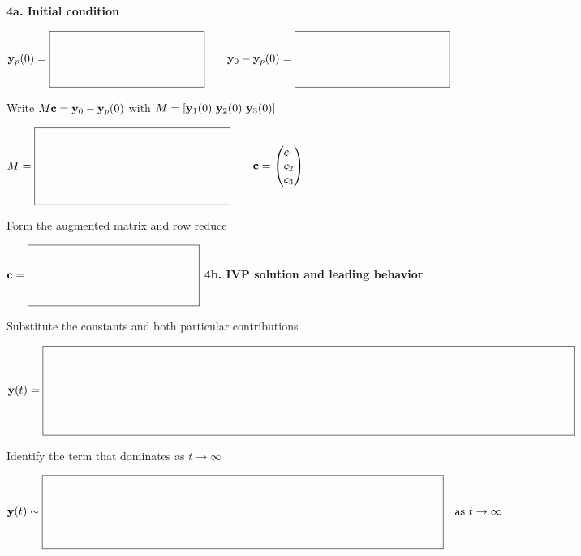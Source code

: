 \documentclass[11pt,letterpaper]{article}
\newcommand{\IVPBlank}[2]{%
  \vcenter{\hbox{$\boxed{\rule{0pt}{#2}\makebox[#1]{}}$}}}
\newcommand{\IVPWork}[1]{%
  \par\noindent\fbox{\parbox[t][#1][t]{\dimexpr\linewidth-2\fboxsep-2\fboxrule\relax}{%
    \vfill\textcolor{black!18}{\rule{\linewidth}{0.3pt}}}}\par}
\begin{document}
\newpage
\textbf{4a. Initial condition}\par
$\displaystyle\vect{y}_p(0)=\IVPBlank{1.8in}{0.6in}\qquad
\vect{y}_0-\vect{y}_p(0)=\IVPBlank{1.8in}{0.6in}$
\par Write $M\mathbf{c}=\mathbf{y}_0-\mathbf{y}_p(0)$ with
$M=[\mathbf{y}_1(0)\ \mathbf{y}_2(0)\ \mathbf{y}_3(0)]$
\par
$\displaystyle M=\IVPBlank{2.3in}{0.85in}\qquad
\vect{c}=\begin{pmatrix}c_1\\c_2\\c_3\end{pmatrix}$
\par Form the augmented matrix and row reduce
\IVPWork{1.55in}
$\displaystyle\vect{c}=\IVPBlank{2in}{0.65in}$
\vfill
\textbf{4b. IVP solution and leading behavior}\par
Substitute the constants and both particular contributions
\par
$\displaystyle\vect{y}(t)=\IVPBlank{6.4in}{1in}$
\par Identify the term that dominates as $t\to\infty$
\IVPWork{0.65in}
$\displaystyle\vect{y}(t)\sim\IVPBlank{4.8in}{0.8in}\quad\text{as }t\to\infty$
\end{document}
